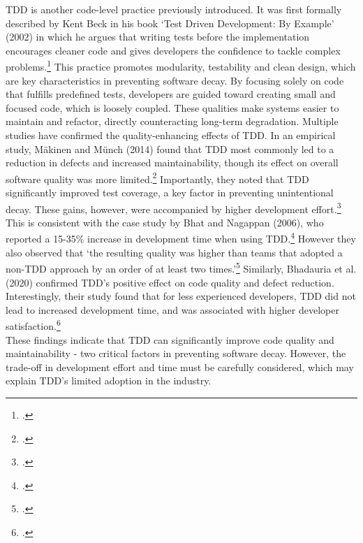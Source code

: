 \ac{TDD} is another code-level practice previously introduced. It was first formally described by Kent Beck in his book
`Test Driven Development: By Example' (2002) in which he argues that writing tests before the implementation
encourages cleaner code and gives developers the confidence to tackle complex problems.\footcite[pp. 8-9]{beckTestdrivenDevelopmentExample2002}
This practice promotes modularity, testability and clean design, which are key characteristics in preventing software decay. By focusing solely on code
that fulfills predefined tests, developers are guided toward creating small and focused code, which is loosely coupled. These qualities make systems
easier to maintain and refactor, directly counteracting long-term degradation.
Multiple studies have confirmed the quality-enhancing effects of \ac{TDD}.
In an empirical study, Mäkinen and Münch (2014) found that  TDD most commonly led to a reduction in defects and increased maintainability, 
though its effect on overall software quality was more limited.\footcite[13]{inproceedings}
Importantly, they noted that TDD significantly improved test coverage, a key factor in preventing unintentional decay.
These gains, however, were accompanied by higher development effort.\footcite[13]{inproceedings}\\
This is consistent with the case study by Bhat and Nagappan (2006), who reported a 15-35\% increase in development time when using \ac{TDD}.\footcite[361]{bhatEvaluatingEfficacyTestdriven2006a}
However they also observed that `the resulting quality was higher than teams that adopted a non-TDD approach by an order of at least two times.'\footcite[361]{bhatEvaluatingEfficacyTestdriven2006a}
Similarly, Bhadauria et al. (2020) confirmed TDD’s positive effect on code quality and defect reduction.
Interestingly, their study found that for less experienced developers, TDD did not lead to increased development time, and was associated with higher developer satisfaction.\footcite[1058]{bhadauriaPerformanceOutcomesTestDriven2020}\\
These findings indicate that TDD can significantly improve code quality and maintainability - two critical factors in preventing software decay.
However, the trade-off in development effort and time must be carefully considered, which may explain TDD's limited adoption in the industry.\\

